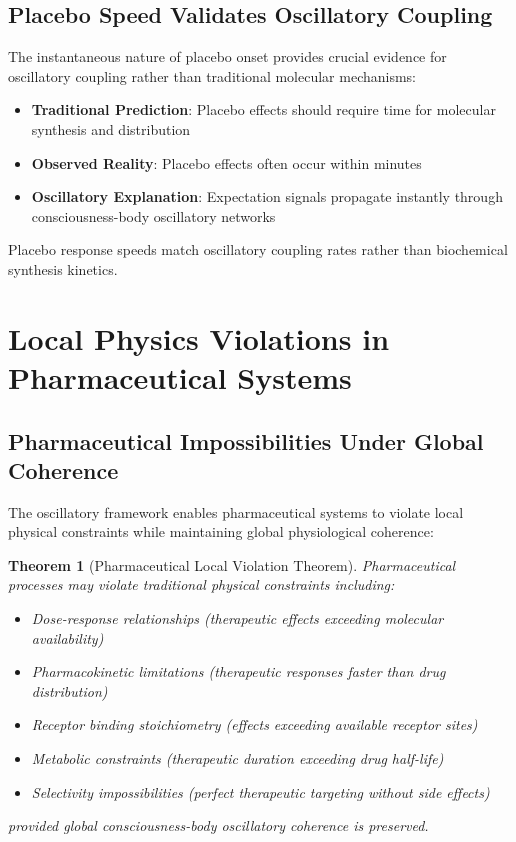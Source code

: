 \documentclass[12pt,a4paper]{article}
\newtheorem{theorem}{Theorem}
\begin{document}
\subsection{Placebo Speed Validates Oscillatory Coupling}

The instantaneous nature of placebo onset provides crucial evidence for oscillatory coupling rather than traditional molecular mechanisms:

\begin{itemize}
\item \textbf{Traditional Prediction}: Placebo effects should require time for molecular synthesis and distribution
\item \textbf{Observed Reality}: Placebo effects often occur within minutes
\item \textbf{Oscillatory Explanation}: Expectation signals propagate instantly through consciousness-body oscillatory networks
\end{itemize}

Placebo response speeds match oscillatory coupling rates rather than biochemical synthesis kinetics.

\section{Local Physics Violations in Pharmaceutical Systems}

\subsection{Pharmaceutical Impossibilities Under Global Coherence}

The oscillatory framework enables pharmaceutical systems to violate local physical constraints while maintaining global physiological coherence:

\begin{theorem}[Pharmaceutical Local Violation Theorem]
Pharmaceutical processes may violate traditional physical constraints including:
\begin{itemize}
\item Dose-response relationships (therapeutic effects exceeding molecular availability)
\item Pharmacokinetic limitations (therapeutic responses faster than drug distribution)
\item Receptor binding stoichiometry (effects exceeding available receptor sites)
\item Metabolic constraints (therapeutic duration exceeding drug half-life)
\item Selectivity impossibilities (perfect therapeutic targeting without side effects)
\end{itemize}
provided global consciousness-body oscillatory coherence is preserved.
\end{theorem}
\end{document}
